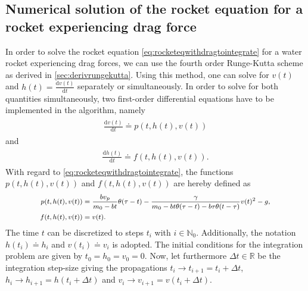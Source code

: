\documentclass[a4paper,11pt]{report}
\begin{document}
\subsection{Numerical solution of the rocket equation for a rocket experiencing drag force}
In order to solve the rocket equation \cref{eq:rocketeqwithdragtointegrate} for a water rocket experiencing drag forces, we can use the fourth order Runge-Kutta scheme as derived in \cref{sec:derivrungekutta}. Using this method, one can solve for $v(t)$ and $h(t) = \frac{\mathrm{d}v(t)}{\mathrm{d}t}$ separately or simultaneously. In order to solve for both quantities simultaneously, two first-order differential equations have to be implemented in the algorithm, namely \begin{align}
	\begin{aligned}
		\frac{\mathrm{d}v(t)}{\mathrm{d}t} \doteq p(t, h(t), v(t))
	\end{aligned}
\end{align} and \begin{align}
\begin{aligned}
	\frac{\mathrm{d}h(t)}{\mathrm{d}t} \doteq f(t, h(t), v(t)).
\end{aligned}
\end{align} With regard to \cref{eq:rocketeqwithdragtointegrate}, the functions $p(t, h(t), v(t))$ and $f(t, h(t), v(t))$ are hereby defined as \begin{align}\footnotesize
\begin{aligned}\label{eq:reqdrag_rungekutta_1}
	p(t, h(t), v(t)) &= \frac{bv_p}{m_0-bt}\theta(\tau-t)-\frac{\gamma}{m_0-bt\theta(\tau-t)-b\tau\theta(t-\tau)}v(t)^2-g, \\
	f(t, h(t), v(t)) &= v(t).
\end{aligned}
\end{align} The time $t$ can be discretized to steps $t_i$ with $i \in \mathbb{N}_0$. Additionally, the notation $h(t_i) \doteq h_i$ and $v(t_i) \doteq v_i$ is adopted. The initial conditions for the integration problem are given by $t_0 = h_0 = v_0 = 0$. Now, let furthermore $\Delta t \in \mathbb{R}$ be the integration step-size giving the propagations $t_i \rightarrow t_{i+1} = t_i + \Delta t$, $h_i \rightarrow h_{i+1} = h(t_i+ \Delta t)$ and $v_i \rightarrow v_{i+1} = v(t_i + \Delta t)$.
\end{document}

